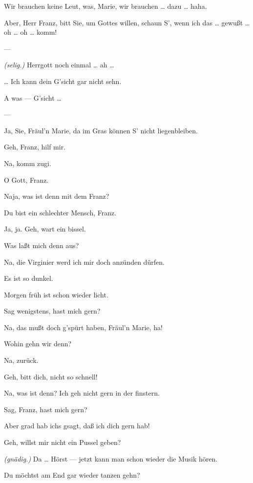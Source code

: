 \documentclass[
	final,
	a4paper,
	ngerman,
	mpinclude = true, %
	twoside = true,
	open = right,
	cleardoublepage = plain,
	DIV = 13,
	BCOR = 1cm,
	titlepage = firstiscover,
	]{scrbook}
\newcommand{\direction}[1]{\textit{(#1)}}
\newcommand{\hiat}{---}
\newcommand{\thecharacter}[1]{\textup{\textsc{#1}}}
\newcommand{\thesoldat}{\thecharacter{Soldat}}
\newcommand{\themaedchen}{\thecharacter{Stubenmädchen}}
\newcommand{\character}[1]{\item[#1:]}
\newcommand{\soldat}{\character{\thesoldat}}
\newcommand{\maedchen}{\character{\themaedchen}}
\begin{document}
\begin{play}
	\soldat
	Wir brauchen keine Leut, was, Marie, wir brauchen \ldots{} dazu \ldots{} haha.

	\maedchen
	Aber, Herr Franz, bitt Sie, um Gottes willen, schaun S', wenn ich das \ldots{} gewußt \ldots{} oh \ldots{} oh \ldots{} komm!

	\hiat

	\soldat
	\direction{selig.} Herrgott noch einmal \ldots{} ah \ldots{}

	\maedchen
	\ldots{} Ich kann dein G'sicht gar nicht sehn.

	\soldat
	A was --- G'sicht \ldots{}

	\hiat

	\soldat
	Ja, Sie, Fräul'n Marie, da im Gras können S' nicht liegenbleiben.

	\maedchen
	Geh, Franz, hilf mir.

	\soldat
	Na, komm zugi.

	\maedchen
	O Gott, Franz.

	\soldat
	Naja, was ist denn mit dem Franz?

	\maedchen
	Du bist ein schlechter Mensch, Franz.

	\soldat
	Ja, ja. Geh, wart ein bissel.

	\maedchen
	Was laßt mich denn aus?

	\soldat
	Na, die Virginier werd ich mir doch anzünden dürfen.

	\maedchen
	Es ist so dunkel.

	\soldat
	Morgen früh ist schon wieder licht.

	\maedchen
	Sag wenigstens, hast mich gern?

	\soldat
	Na, das mußt doch g'spürt haben, Fräul'n Marie, ha!

	\maedchen
	Wohin gehn wir denn?

	\soldat
	Na, zurück.

	\maedchen
	Geh, bitt dich, nicht so schnell!

	\soldat
	Na, was ist denn? Ich geh nicht gern in der finstern.

	\maedchen
	Sag, Franz, hast mich gern?

	\soldat
	Aber grad hab ichs gsagt, daß ich dich gern hab!

	\maedchen
	Geh, willst mir nicht ein Pussel geben?

	\soldat
	\direction{gnädig.} Da \ldots{} Hörst --- jetzt kann man schon wieder die Musik hören.

	\maedchen
	Du möchtst am End gar wieder tanzen gehn?


\end{play}
\end{document}
